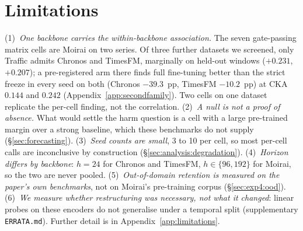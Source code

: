 \section{Limitations}
\label{sec:limitations}

(1)~\emph{One backbone carries the within-backbone association.}  The seven
gate-passing matrix cells are Moirai on two series.  Of three further datasets we
screened, only Traffic admits Chronos and TimesFM, marginally on held-out windows
($+0.231$, $+0.207$); a pre-registered arm there finds full fine-tuning better
than the strict freeze in every seed on both (Chronos $-39.3$~pp, TimesFM
$-10.2$~pp) at CKA $0.144$ and $0.242$ (Appendix~\ref{app:secondfamily}).  Two
cells on one dataset replicate the per-cell finding, not the correlation.
(2)~\emph{A null is not a proof of absence.}  What would settle the harm question
is a cell with a large pre-trained margin over a strong baseline, which these
benchmarks do not supply (\S\ref{sec:forecasting}).
(3)~\emph{Seed counts are small}, 3 to 10 per cell, so most per-cell calls are
inconclusive by construction (\S\ref{sec:analysis:degradation}).
(4)~\emph{Horizon differs by backbone}: $h{=}24$ for Chronos and TimesFM,
$h{\in}\{96,192\}$ for Moirai, so the two are never pooled.
(5)~\emph{Out-of-domain retention is measured on the paper's own benchmarks}, not
on Moirai's pre-training corpus (\S\ref{sec:exp4:ood}).
(6)~\emph{We measure whether restructuring was necessary, not what it changed}:
linear probes on these encoders do not generalise under a temporal split
(supplementary \texttt{ERRATA.md}).  Further detail is in
Appendix~\ref{app:limitations}.
